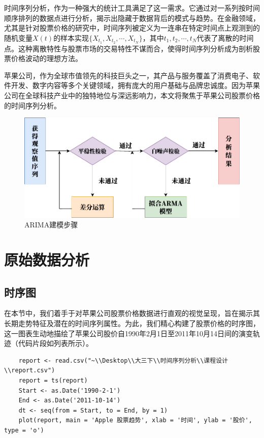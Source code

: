 \documentclass{article} %
\begin{document}
时间序列分析，作为一种强大的统计工具满足了这一需求。它通过对一系列按时间顺序排列的数据点进行分析，揭示出隐藏于数据背后的模式与趋势。在金融领域，尤其是针对股票价格的研究中，时间序列被定义为一连串在特定时间点上观测到的随机变量\(X(t)\)的样本实现\(\{X_{t_1}, X_{t_2},\cdots, X_{t_N}\}\)，其中\(t_1, t_2, \cdots, t_N\)代表了离散的时间点。这种离散特性与股票市场的交易特性不谋而合，使得时间序列分析成为剖析股票价格波动的理想方法。

苹果公司，作为全球市值领先的科技巨头之一，其产品与服务覆盖了消费电子、软件开发、数字内容等多个关键领域，拥有庞大的用户基础与品牌忠诚度。因为苹果公司在全球科技产业中的独特地位与深远影响力，本文将聚焦于苹果公司股票价格的时间序列分析。

\begin{figure}[h] %
	\centering %
	\includegraphics[width=\textwidth]{pic/ARIMA_new.pdf} %
	\caption{ARIMA建模步骤} %
	\label{} %
\end{figure}
\FloatBarrier

\section{原始数据分析}

\subsection{时序图}
在本节中，我们着手于对苹果公司股票价格数据进行直观的视觉呈现，旨在揭示其长期走势特征及潜在的时间序列属性。为此，我们精心构建了股票价格的时序图，这一图表生动地描绘了苹果公司股价自1990年2月1日至2011年10月14日间的演变轨迹（代码片段如列表所示）。

\begin{lstlisting}
    report <- read.csv("~\\Desktop\\大三下\\时间序列分析\\课程设计\\report.csv")
    report = ts(report)
    Start <- as.Date('1990-2-1')
    End <- as.Date('2011-10-14')
    dt <- seq(from = Start, to = End, by = 1)
    plot(report, main = 'Apple 股票趋势', xlab = '时间', ylab = '股价', type = 'o')
\end{lstlisting}
\end{document}
